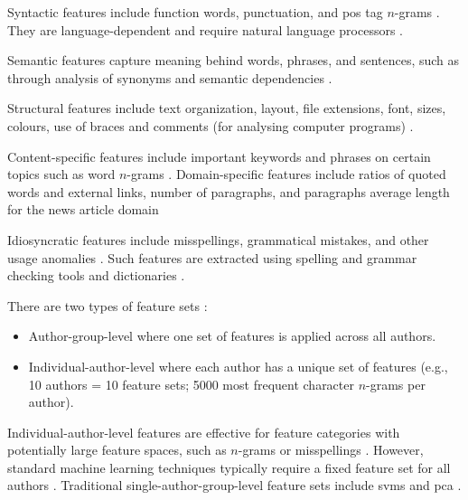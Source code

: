 \begin{definition}
    Syntactic features include function words, punctuation, and \ac{pos} tag $n$-grams \cite{abbasi_writeprints_2008}.
    They are language-dependent and require natural language processors \cite{neal_surveying_2018}.
\end{definition}

\begin{definition}
    Semantic features capture meaning behind words, phrases, and sentences, such as through analysis of synonyms and semantic dependencies \cite{neal_surveying_2018}.
\end{definition}

\begin{definition}
    Structural features include text organization, layout, file extensions, font, sizes, colours, 
    use of braces and comments (for analysing computer programs) \cite{abbasi_writeprints_2008,neal_surveying_2018}.
\end{definition}

\begin{definition}
    Content-specific features include important keywords and phrases on certain topics such as word $n$-grams \cite{abbasi_writeprints_2008}.
    Domain-specific features include ratios of quoted words and external links, number of paragraphs, 
    and paragraphs average length for the news article domain \cite{potthast_stylometric_2018}
\end{definition}

\begin{definition}
    Idiosyncratic features include misspellings, grammatical mistakes, and other usage anomalies \cite{abbasi_writeprints_2008,neal_surveying_2018}.
    Such features are extracted using spelling and grammar checking tools and dictionaries \cite{abbasi_writeprints_2008}.
\end{definition}

\begin{definition}
    There are two types of feature sets \cite{abbasi_writeprints_2008,neal_surveying_2018}:
    \begin{itemize}
        \item Author-group-level where one set of features is applied across all authors.
        \item Individual-author-level where each author has a unique set of features (e.g., 10 authors = 10 feature sets; 5000 most frequent character $n$-grams per author).
    \end{itemize}
    Individual-author-level features are effective for feature categories with potentially large feature spaces, such as $n$-grams or misspellings \cite{abbasi_writeprints_2008}.
    However, standard machine learning techniques typically require a fixed feature set for all authors \cite{abbasi_writeprints_2008}.
    Traditional single-author-group-level feature sets include \acp{svm} and \ac{pca} \cite{abbasi_writeprints_2008}.
\end{definition}

